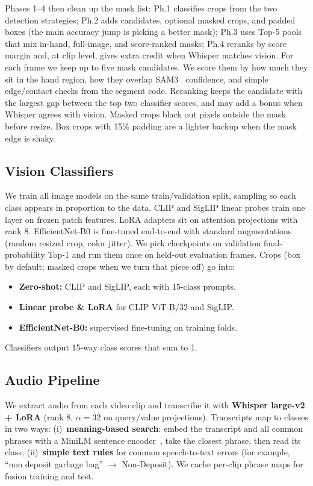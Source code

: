 \documentclass[conference]{IEEEtran}
\begin{document}
Phases 1--4 then clean up the mask list: Ph.1 classifies crops from the two detection strategies; Ph.2 adds candidates, optional masked crops, and padded boxes (the main accuracy jump is picking a better mask); Ph.3 uses Top-5 pools that mix in-hand, full-image, and score-ranked masks; Ph.4 reranks by score margin and, at clip level, gives extra credit when Whisper matches vision.
For each frame we keep up to five mask candidates. We score them by how much they sit in the hand region, how they overlap SAM3~\cite{carion2025sam3} confidence, and simple edge/contact checks from the segment code.
Reranking keeps the candidate with the largest gap between the top two classifier scores, and may add a bonus when Whisper agrees with vision.
Masked crops black out pixels outside the mask before resize. Box crops with 15\% padding are a lighter backup when the mask edge is shaky.

\subsection{Vision Classifiers}
We train all image models on the same train/validation split, sampling so each class appears in proportion to the data.
CLIP and SigLIP linear probes train one layer on frozen patch features. LoRA adapters sit on attention projections with rank 8.
EfficientNet-B0 is fine-tuned end-to-end with standard augmentations (random resized crop, color jitter).
We pick checkpoints on validation final-probability Top-1 and run them once on held-out evaluation frames.
Crops (box by default; masked crops when we turn that piece off) go into:
\begin{itemize}
\item \textbf{Zero-shot:} CLIP and SigLIP, each with 15-class prompts.
\item \textbf{Linear probe \& LoRA} for CLIP ViT-B/32 and SigLIP.
\item \textbf{EfficientNet-B0:} supervised fine-tuning on training folds.
\end{itemize}
Classifiers output 15-way class scores that sum to 1.

\subsection{Audio Pipeline}
We extract audio from each video clip and transcribe it with \textbf{Whisper large-v2 + LoRA} (rank 8, $\alpha{=}32$ on query/value projections).
Transcripts map to classes in two ways: (i)~\textbf{meaning-based search}: embed the transcript and all common phrases with a MiniLM sentence encoder~\cite{reimers2019sentence}, take the closest phrase, then read its class; (ii)~\textbf{simple text rules} for common speech-to-text errors (for example, ``non deposit garbage bag'' $\rightarrow$ Non-Deposit).
We cache per-clip phrase maps for fusion training and test.
\end{document}
